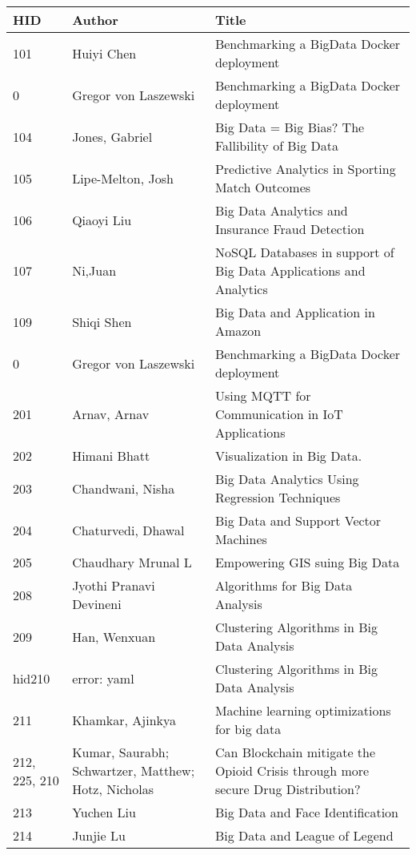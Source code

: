 \documentclass[12pt]{book}
\begin{document}
\begin{footnotesize}
\begin{longtable}{|p{1cm}p{5cm}p{9cm}|}
\hline \textbf{HID} & \textbf{Author} & \textbf{Title} \\ \hline \hline

101 & Huiyi Chen & Benchmarking a BigData Docker deployment  \\
\hline
0 & Gregor von Laszewski & Benchmarking a BigData Docker deployment  \\
\hline
104 & Jones, Gabriel & Big Data = Big Bias? The Fallibility of Big Data  \\
\hline
105 & Lipe-Melton, Josh & Predictive Analytics in Sporting Match Outcomes  \\
\hline
106 & Qiaoyi Liu & Big Data Analytics and Insurance Fraud Detection  \\
\hline
107 & Ni,Juan & NoSQL Databases in support of Big Data Applications and Analytics  \\
\hline
109 & Shiqi Shen & Big Data and Application in Amazon  \\
\hline
0 & Gregor von Laszewski & Benchmarking a BigData Docker deployment  \\
\hline
201 & Arnav, Arnav & Using MQTT for Communication in IoT Applications  \\
\hline
202 & Himani Bhatt & Visualization in Big Data.  \\
\hline
203 & Chandwani, Nisha & Big Data Analytics Using Regression Techniques  \\
\hline
204 & Chaturvedi, Dhawal & Big Data and Support Vector Machines  \\
\hline
205 & Chaudhary Mrunal L & Empowering GIS suing Big Data  \\
\hline
208 & Jyothi Pranavi Devineni & Algorithms for Big Data Analysis  \\
\hline
209 & Han, Wenxuan & Clustering Algorithms in Big Data Analysis  \\
\hline
hid210 & error: yaml & Clustering Algorithms in Big Data Analysis  \\
\hline
211 & Khamkar, Ajinkya & Machine learning optimizations for big data  \\
\hline
212, 225, 210 & Kumar, Saurabh; Schwartzer, Matthew; Hotz, Nicholas & Can Blockchain mitigate the Opioid Crisis through more secure Drug Distribution?  \\
\hline
213 & Yuchen Liu & Big Data and Face Identification  \\
\hline
214 & Junjie Lu & Big Data and League of Legend  \\

\end{longtable}
\end{footnotesize}
\end{document}
